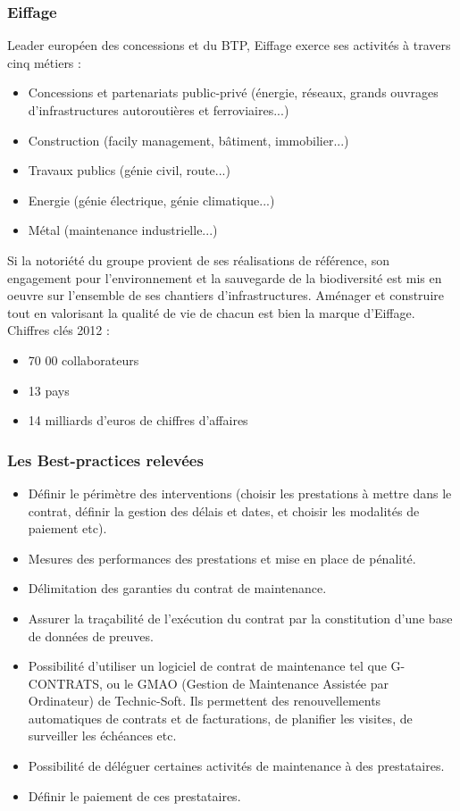 \subsubsection{Eiffage}
	Leader européen des concessions et du BTP, Eiffage exerce ses activités à travers cinq métiers :
\begin{itemize}
	\item Concessions et partenariats public-privé (énergie, réseaux, grands ouvrages d'infrastructures autoroutières et ferroviaires...)
	\item Construction (facily management, bâtiment, immobilier...)
	\item Travaux publics (génie civil, route...)
	\item Energie (génie électrique, génie climatique...)
	\item Métal (maintenance industrielle...)
\end{itemize}
\bigbreak
	Si la notoriété du groupe provient de ses réalisations de référence, son engagement pour l'environnement et la sauvegarde de la biodiversité est mis en oeuvre sur l'ensemble de ses chantiers d'infrastructures. Aménager et construire tout en valorisant la qualité de vie de chacun est bien la marque d'Eiffage.
\bigbreak
Chiffres clés 2012 :
\begin{itemize}
	\item 70 00 collaborateurs
	\item 13 pays
	\item 14 milliards d'euros de chiffres d'affaires
\end{itemize}

\subsubsection{Les Best-practices relevées}
\begin{itemize}
	\item Définir le périmètre des interventions (choisir les prestations à mettre dans le contrat, définir la gestion des délais et dates, et choisir les modalités de paiement etc).
	\item Mesures des performances des prestations et mise en place de pénalité.
	\item Délimitation des garanties du contrat de maintenance.
	\item Assurer la traçabilité de l'exécution du contrat par la constitution d'une base de données de preuves.
	\item Possibilité d'utiliser un logiciel de contrat de maintenance tel que G-CONTRATS, ou le GMAO (Gestion de Maintenance Assistée par Ordinateur) de Technic-Soft. Ils permettent des renouvellements automatiques de contrats et de facturations, de planifier les visites, de surveiller les échéances etc.
	\item Possibilité de déléguer certaines activités de maintenance à des prestataires. 
	\item Définir le paiement de ces prestataires.
\end{itemize}
